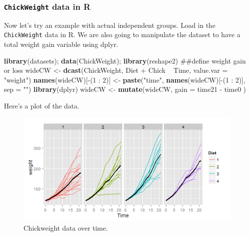 \documentclass[]{article}
\newenvironment{Shaded}{\begin{snugshade}}{\end{snugshade}}
\newcommand{\KeywordTok}[1]{\textcolor[rgb]{0.13,0.29,0.53}{\textbf{{#1}}}}
\newcommand{\DataTypeTok}[1]{\textcolor[rgb]{0.13,0.29,0.53}{{#1}}}
\newcommand{\DecValTok}[1]{\textcolor[rgb]{0.00,0.00,0.81}{{#1}}}
\newcommand{\StringTok}[1]{\textcolor[rgb]{0.31,0.60,0.02}{{#1}}}
\newcommand{\NormalTok}[1]{{#1}}
\begin{document}
\subsubsection{\texttt{ChickWeight} data in
R}\label{chickweight-data-in-r}

Now let's try an example with actual independent groups. Load in the
\texttt{ChickWeight} data in R. We are also going to manipulate the
dataset to have a total weight gain variable using dplyr.

\begin{Shaded}
\begin{Highlighting}[]
\KeywordTok{library}\NormalTok{(datasets); }\KeywordTok{data}\NormalTok{(ChickWeight); }\KeywordTok{library}\NormalTok{(reshape2)}
\NormalTok{##define weight gain or loss}
\NormalTok{wideCW <-}\StringTok{ }\KeywordTok{dcast}\NormalTok{(ChickWeight, Diet +}\StringTok{ }\NormalTok{Chick ~}\StringTok{ }\NormalTok{Time,}
                \DataTypeTok{value.var =} \StringTok{"weight"}\NormalTok{)}
\KeywordTok{names}\NormalTok{(wideCW)[-(}\DecValTok{1} \NormalTok{:}\StringTok{ }\DecValTok{2}\NormalTok{)] <-}\StringTok{ }\KeywordTok{paste}\NormalTok{(}\StringTok{"time"}\NormalTok{,}
                                 \KeywordTok{names}\NormalTok{(wideCW)[-(}\DecValTok{1} \NormalTok{:}\StringTok{ }\DecValTok{2}\NormalTok{)],}
                                 \DataTypeTok{sep =} \StringTok{""}\NormalTok{)}
\KeywordTok{library}\NormalTok{(dplyr)}
\NormalTok{wideCW <-}\StringTok{ }\KeywordTok{mutate}\NormalTok{(wideCW,}
  \DataTypeTok{gain =} \NormalTok{time21 -}\StringTok{ }\NormalTok{time0}
\NormalTok{)}
\end{Highlighting}
\end{Shaded}

Here's a plot of the data.

\begin{figure}[htbp]
\centering
\includegraphics{LeanPub/images/chickweight-1.png}
\caption{Chickweight data over time.}
\end{figure}
\end{document}
